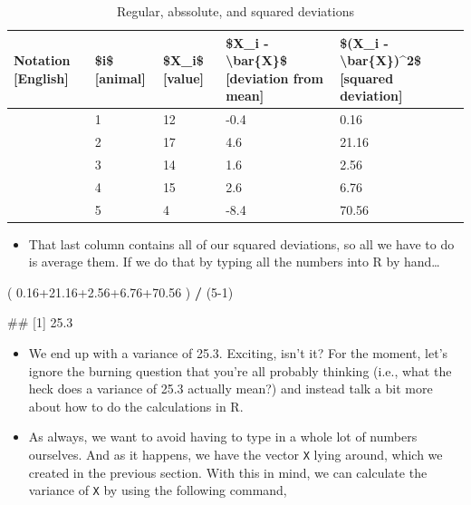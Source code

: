 \documentclass[
]{book}
\newenvironment{Shaded}{\begin{snugshade}}{\end{snugshade}}
\newcommand{\DecValTok}[1]{\textcolor[rgb]{0.00,0.00,0.81}{#1}}
\newcommand{\FloatTok}[1]{\textcolor[rgb]{0.00,0.00,0.81}{#1}}
\newcommand{\NormalTok}[1]{#1}
\newcommand{\SpecialCharTok}[1]{\textcolor[rgb]{0.81,0.36,0.00}{\textbf{#1}}}
\providecommand{\tightlist}{%
  \setlength{\itemsep}{0pt}\setlength{\parskip}{0pt}}
\begin{document}
\begin{table}

\caption{\label{tab:unnamed-chunk-188}Regular, abssolute, and squared deviations}
\centering
\begin{tabular}[t]{lllll}
\toprule
Notation [English] & \$i\$ [animal] & \$X\_i\$ [value] & \$X\_i - \textbackslash{}bar\{X\}\$ [deviation from mean] & \$(X\_i - \textbackslash{}bar\{X\})\textasciicircum{}2\$ [squared deviation]\\
\midrule
 & 1 & 12 & -0.4 & 0.16\\
 & 2 & 17 & 4.6 & 21.16\\
 & 3 & 14 & 1.6 & 2.56\\
 & 4 & 15 & 2.6 & 6.76\\
 & 5 & 4 & -8.4 & 70.56\\
\bottomrule
\end{tabular}
\end{table}

\begin{itemize}
\tightlist
\item
  That last column contains all of our squared deviations, so all we have to do is average them. If we do that by typing all the numbers into R by hand\ldots{}
\end{itemize}

\begin{Shaded}
\begin{Highlighting}[]
\NormalTok{( }\FloatTok{0.16+21.16+2.56+6.76+70.56}\NormalTok{ ) }\SpecialCharTok{/}\NormalTok{ (}\DecValTok{5{-}1}\NormalTok{)}
\end{Highlighting}
\end{Shaded}

\begin{Shaded}
\begin{Highlighting}[]
\NormalTok{\#\# [1] 25.3}
\end{Highlighting}
\end{Shaded}

\begin{itemize}
\item
  We end up with a variance of 25.3. Exciting, isn't it? For the moment, let's ignore the burning question that you're all probably thinking (i.e., what the heck does a variance of 25.3 actually mean?) and instead talk a bit more about how to do the calculations in R.
\item
  As always, we want to avoid having to type in a whole lot of numbers ourselves. And as it happens, we have the vector \texttt{X} lying around, which we created in the previous section. With this in mind, we can calculate the variance of \texttt{X} by using the following command,
\end{itemize}
\end{document}
